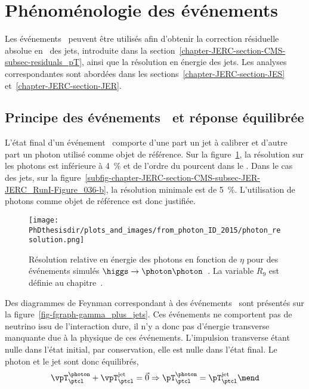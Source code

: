 \section{Phénoménologie des événements \Gjets}\label{chapter-JERC-section-pheno-GJets}
Les événements \Gjets\ peuvent être utilisés afin d'obtenir la correction résiduelle absolue en \pT\ des jets, introduite dans la section~\ref{chapter-JERC-section-CMS-subsec-residuals_pT}, ainsi que la résolution en énergie des jets. Les analyses correspondantes sont abordées dans les sections~\ref{chapter-JERC-section-JES} et~\ref{chapter-JERC-section-JER}.
\subsection{Principe des événements \Gjets\ et réponse équilibrée}
L'état final d'un événement \Gjets\ comporte d'une part un jet à calibrer et d'autre part un photon utilisé comme objet de référence.
Sur la figure~\ref{fig-chapter-JERC-section-pheno-GJets-photon_resolution}, la résolution sur les photons est inférieure à \SI{4}{\%} et de l'ordre du pourcent dans le \CMSbarrel. Dans le cas des jets, sur la figure~\ref{subfig-chapter-JERC-section-CMS-subsec-JER-JERC_RunI-Figure_036-b}, la résolution minimale est de \SI{5}{\%}.
L'utilisation de photons comme objet de référence est donc justifiée.
\begin{figure}[h]
\centering
\texttt{[image: \\PhDthesisdir/plots\_and\_images/from\_photon\_ID\_2015/photon\_resolution.png]}
\caption[Résolution en énergie des photons.]{Résolution relative en énergie des photons en fonction de $\eta$ pour des événements simulés $\higgs\to\photon\photon$~\cite{photon_ID_2015}. La variable $R_9$ est définie au chapitre~.}
\label{fig-chapter-JERC-section-pheno-GJets-photon_resolution}
\end{figure}
\par Des diagrammes de Feynman correspondant à des événements \Gjets\ sont présentés sur la figure~\ref{fig-fgraph-gamma_plus_jets}.
Ces événements ne comportent pas de neutrino issu de l'interaction dure, il n'y a donc pas d'énergie transverse manquante due à la physique de ces événements.
L'impulsion transverse étant nulle dans l'état initial, par conservation, elle est nulle dans l'état final. Le photon et le jet sont donc équilibrés, \ie
\begin{equation}
\vpT_\ptcl^{\photon} + \vpT_\ptcl^\text{jet} = \vec{0}
\Rightarrow
\pT_\ptcl^{\photon} = \pT_\ptcl^\text{jet}
\mend
\end{equation}
